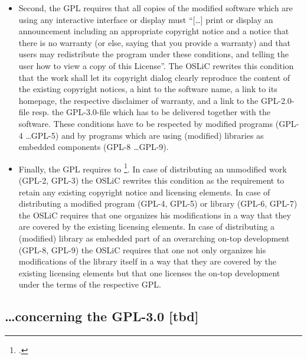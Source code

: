 \begin{itemize}
\begin{itemize}
    \item Second, the GPL requires that all copies of the modified software
    which are using any interactive interface or display must \enquote{[\ldots]
    print or display an announcement including an appropriate copyright notice
    and a notice that there is no warranty (or else, saying that you provide a
    warranty) and that users may redistribute the program under these
    conditions, and telling the user how to view a copy of this License}. The
    OSLiC rewrites this condition that the work shall let its copyright dialog
    clearly reproduce the content of the existing copyright notices, a hint to
    the software name, a link to its homepage, the respective disclaimer of
    warranty, and a link to the GPL-2.0-file resp. the GPL-3.0-file which has to
    be delivered together with the software. These conditions have to be
    respected by modified programs (GPL-4 \ldots GPL-5) and by programs which
    are using (modified) libraries as embedded components (GPL-8 \ldots GPL-9).
    
    \item Finally, the GPL requires to \footcite[cf.][\nopage
    wp.\ §2]{Gpl20OsiLicense1991a}. In case of distributing an unmodified work
    (GPL-2, GPL-3) the OSLiC rewrites this condition as the requirement to
    retain any existing copyright notice and licensing elements. In case of
    distributing a modified program (GPL-4, GPL-5) or library (GPL-6, GPL-7) the
    OSLiC requires that one organizes his modifications in a way that they are
    covered by the existing licensing elements. In case of distributing a
    (modified) library as embedded part of an overarching on-top development
    (GPL-8, GPL-9) the OSLiC requires that one not only organizes his
    modifications of the library itself in a way that they are covered by the
    existing licensing elements but that one licenses the on-top development
    under the terms of the respective GPL.
  \end{itemize}
  

\end{itemize}


\subsection{\ldots concerning the GPL-3.0 [tbd]}





%
